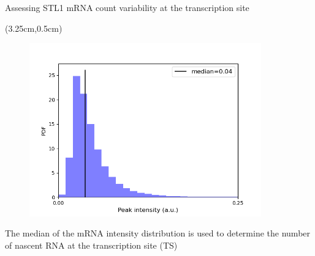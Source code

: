 \documentclass[aspectratio=1610]{beamer}					%
\begin{document}
\begin{frame}{Assessing STL1 mRNA count variability at the transcription site}

\begin{textblock*}{5cm}(3.25cm,0.5cm)
\begin{figure}
\includegraphics[width=10cm]{int-hist.png}
\end{figure}
\end{textblock*}

\vspace{7.25cm}
The median of the mRNA intensity distribution is used to determine the number of nascent RNA at the transcription site (TS)

\end{frame}
\end{document}
